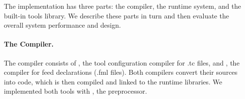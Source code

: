 The \padsd{} implementation has three parts: the compiler, the runtime
system, and the built-in tools library. We describe these
parts in turn and then evaluate the overall system performance and design.


\paragraph*{The Compiler.}
The \padsd{} compiler consists of
, the tool configuration compiler for .tc files, 
and 
, the compiler for feed declarations (.fml files). 
Both compilers convert their sources into \ocaml{} code, which is then
compiled
and linked to the runtime libraries.  We implemented both tools with
\camlp{}, the \ocaml{} preprocessor. 


